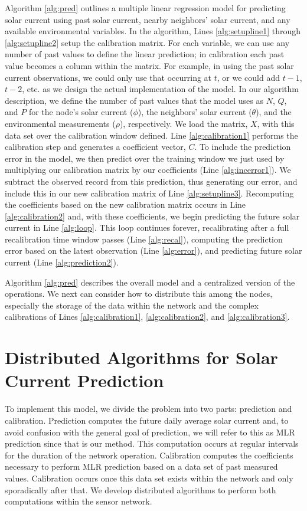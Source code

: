 \documentclass[prodmode,acmtosn]{acmsmall}
\begin{document}
Algorithm \ref{alg:pred} outlines a multiple linear regression model for predicting solar current using past solar current, nearby neighbors' solar current, and any available environmental variables.
In the algorithm, Lines \ref{alg:setupline1} through \ref{alg:setupline2} setup the calibration matrix.
For each variable, we can use any number of past values to define the linear prediction; in calibration each past value becomes a column within the matrix.
For example, in using the past solar current observations, we could only use that occurring at $t$, or we could add $t-1$, $t-2$, etc. as we design the actual implementation of the model.
In our algorithm description, we define the number of past values that the model uses as $N$, $Q$, and $P$ for the node's solar current ($\phi$), the neighbors' solar current ($\theta$), and the environmental measurements ($\rho$), respectively.
We load the matrix, $X$, with this data set over the calibration window defined.
Line \ref{alg:calibration1} performs the calibration step and generates a coefficient vector, $C$.
To include the prediction error in the model, we then predict over the training window we just used by multiplying our calibration matrix by our coefficients (Line \ref{alg:incerror1}).
We subtract the observed record from this prediction, thus generating our error, and include this in our new calibration matrix of Line \ref{alg:setupline3}.
Recomputing the coefficients based on the new calibration matrix occurs in Line \ref{alg:calibration2} and, with these coefficients, we begin predicting the future solar current in Line \ref{alg:loop}.
This loop continues forever, recalibrating after a full recalibration time window passes (Line \ref{alg:recal}), computing the prediction error based on the latest observation (Line \ref{alg:error}), and predicting future solar current (Line \ref{alg:prediction2}).

Algorithm \ref{alg:pred} describes the overall model and a centralized version of the operations.
We next can consider how to distribute this among the nodes, especially the storage of the data within the network and the complex calibrations of Lines \ref{alg:calibration1}, \ref{alg:calibration2}, and \ref{alg:calibration3}.

\section{Distributed Algorithms for Solar Current Prediction} \label{sec:solar-algs}
To implement this model, we divide the problem into two parts: prediction and calibration.
Prediction computes the future daily average solar current and, to avoid confusion with the general goal of prediction, we will refer to this as MLR prediction since that is our method.
This computation occurs at regular intervals for the duration of the network operation.
Calibration computes the coefficients necessary to perform MLR prediction based on a data set of past measured values.
Calibration occurs once this data set exists within the network and only sporadically after that.
We develop distributed algorithms to perform both computations within the sensor network.
\end{document}
